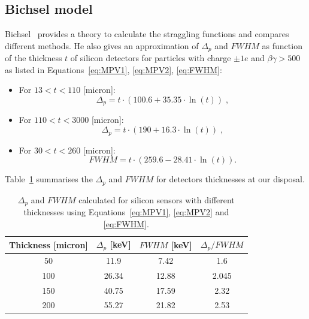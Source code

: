 \subsection{Bichsel model}
Bichsel~\cite{Bichsel} provides a theory to calculate the
straggling functions and compares different methods. He also gives an
approximation of $\Delta_{p}$ and $FWHM$ as function of the thickness
$t$ of silicon detectors for particles with charge $\pm1e$ and
$\beta\gamma>500$ as listed in Equations~\ref{eq:MPV1}, \ref{eq:MPV2},
\ref{eq:FWHM}:

\begin{itemize}
\item For $13<t<110$ [micron]:
  \begin{equation}
    \Delta_{p}=t \cdot (100.6+35.35 \cdot \ln(t))\; ,
    \label{eq:MPV1}
  \end{equation}
\item For $110<t<3000$ [micron]:
  \begin{equation}
    \Delta_{p}=t \cdot (190+16.3 \cdot \ln(t))\; ,
    \label{eq:MPV2}
  \end{equation}
\item For $30<t<260$ [micron]:
  \begin{equation}
    FWHM=t \cdot (259.6-28.41 \cdot \ln(t)).
    \label{eq:FWHM}
  \end{equation}
\end{itemize}

Table~\ref{tab:EdepForDifferentThickness} summarises the $\Delta_{p}$
and $FWHM$ for detectors thicknesses at our disposal. 

\begin{table}[htbp]
  \centering
  \caption{$\Delta_{p}$ and $FWHM$ calculated for silicon sensors with
    different thicknesses using Equations~\ref{eq:MPV1}, \ref{eq:MPV2}
    and \ref{eq:FWHM}.}
  \label{tab:EdepForDifferentThickness}
  \begin{tabular}{c c c c}
    \toprule
    Thickness [micron] &  $\Delta_{p}$ [keV] & $FWHM$ [keV] & $\Delta_{p} / FWHM$ \\ 
    \midrule
    50 & 11.9 & 7.42 & 1.6      \\
    100 & 26.34 & 12.88 & 2.045 \\
    150 & 40.75 & 17.59 & 2.32  \\
    200 & 55.27 & 21.82 & 2.53  \\
    \bottomrule
  \end{tabular}
\end{table}


